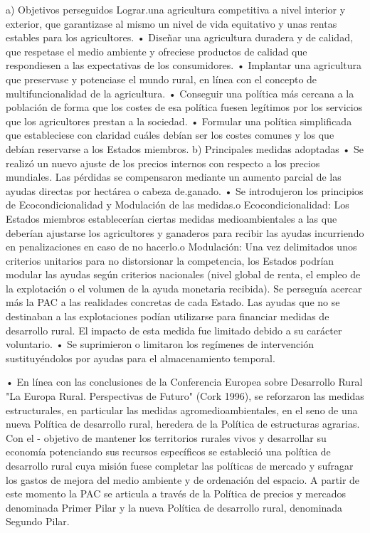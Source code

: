 \documentclass[10pt,a4paper]{article}
\begin{document}
a) Objetivos perseguidos
Lograr.una agricultura competitiva a nivel interior y exterior, que garantizase al mismo un nivel de vida equitativo y unas rentas estables para los agricultores.
• Diseñar una agricultura duradera y de calidad, que respetase el medio ambiente y ofreciese productos de calidad que respondiesen a las expectativas de los consumidores.
• Implantar una agricultura que preservase y potenciase el mundo rural, en línea con el concepto de multifuncionalidad de la agricultura.
• Conseguir una política más cercana a la población de forma que los costes de esa política fuesen legítimos por los servicios que los agricultores prestan a la sociedad.
• Formular una política simplificada que estableciese con claridad cuáles debían ser los costes comunes y los que debían reservarse a los Estados miembros.
b) Principales medidas adoptadas
• Se realizó un nuevo ajuste de los precios internos con respecto a los precios mundiales. Las pérdidas se compensaron mediante un aumento parcial de las ayudas directas por hectárea o cabeza de.ganado.
• Se introdujeron los principios de Ecocondicionalidad y Modulación de las medidas.o Ecocondicionalidad: Los Estados miembros establecerían ciertas medidas medioambientales a las que deberían ajustarse los agricultores y ganaderos para recibir las ayudas incurriendo en penalizaciones en caso de no hacerlo.o Modulación: Una vez delimitados unos criterios unitarios para no distorsionar la competencia, los Estados podrían modular las ayudas según criterios nacionales (nivel global de renta, el empleo de la explotación o el volumen de la ayuda monetaria recibida). Se perseguía acercar más la PAC a las realidades concretas de cada Estado. Las ayudas  que no se destinaban a las explotaciones podían utilizarse para financiar medidas de desarrollo rural. El impacto de esta medida fue limitado debido a su carácter voluntario.
• Se suprimieron o limitaron los regímenes de intervención sustituyéndolos por ayudas para el almacenamiento temporal.

• En línea con las conclusiones de la Conferencia Europea sobre Desarrollo Rural "La Europa Rural. Perspectivas de Futuro" (Cork 1996), se reforzaron las medidas estructurales, en particular las medidas agromedioambientales, en el seno de una nueva Política de desarrollo rural, heredera de la Política de estructuras agrarias. Con el - objetivo de mantener los territorios rurales vivos y desarrollar su economía potenciando sus recursos específicos se estableció una política de desarrollo rural cuya misión fuese completar las políticas de mercado y sufragar los gastos de mejora del medio ambiente y de ordenación del espacio. A partir de este momento la PAC se articula a través de la Política de precios y mercados denominada Primer Pilar y la nueva Política de desarrollo rural, denominada Segundo Pilar.
\end{document}
